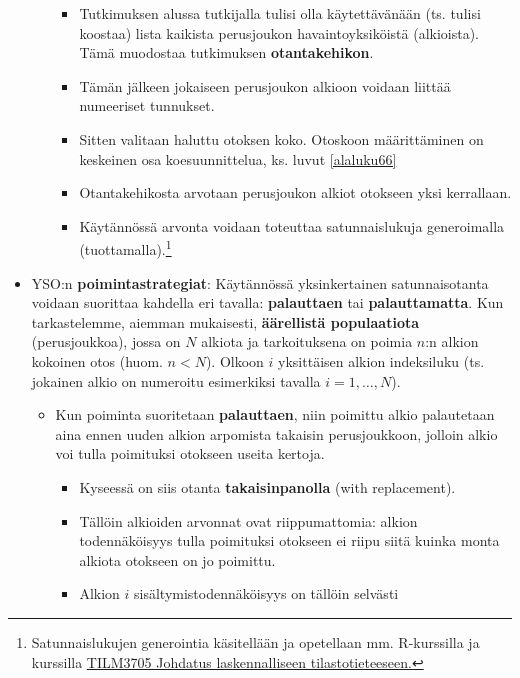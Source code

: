 \documentclass[
]{book}
\providecommand{\tightlist}{%
  \setlength{\itemsep}{0pt}\setlength{\parskip}{0pt}}
\begin{document}
\begin{itemize}
\begin{itemize}
    \begin{itemize}
    \tightlist
    \item
      Tutkimuksen alussa tutkijalla tulisi olla käytettävänään (ts. tulisi koostaa) lista kaikista perusjoukon havaintoyksiköistä (alkioista). Tämä muodostaa tutkimuksen \textbf{otantakehikon}.
    \item
      Tämän jälkeen jokaiseen perusjoukon alkioon voidaan liittää numeeriset tunnukset.
    \item
      Sitten valitaan haluttu otoksen koko. Otoskoon määrittäminen on keskeinen osa koesuunnittelua, ks. luvut \ref{alaluku66}
    \item
      Otantakehikosta arvotaan perusjoukon alkiot otokseen yksi kerrallaan.
    \item
      Käytännössä arvonta voidaan toteuttaa satunnaislukuja generoimalla (tuottamalla).\footnote{{} Satunnaislukujen generointia käsitellään ja opetellaan mm. R-kurssilla ja kurssilla \href{https://opas.peppi.utu.fi/fi/opintojakso/TILM3705/92210}{TILM3705 Johdatus laskennalliseen tilastotieteeseen.}}
    \end{itemize}
  \end{itemize}
\item
  YSO:n \textbf{poimintastrategiat}: Käytännössä yksinkertainen satunnaisotanta voidaan suorittaa kahdella eri tavalla: \textbf{palauttaen} tai \textbf{palauttamatta}. Kun tarkastelemme, aiemman mukaisesti, \textbf{äärellistä populaatiota} (perusjoukkoa), jossa on \(N\) alkiota ja tarkoituksena on poimia \(n\):n alkion kokoinen otos (huom. \(n<N\)). Olkoon \(i\) yksittäisen alkion indeksiluku (ts. jokainen alkio on numeroitu esimerkiksi tavalla \(i = 1,\ldots,N\)).

  \begin{itemize}
  \tightlist
  \item
    Kun poiminta suoritetaan \textbf{palauttaen}, niin poimittu alkio palautetaan aina ennen uuden alkion arpomista takaisin perusjoukkoon, jolloin alkio voi tulla poimituksi otokseen useita kertoja.

    \begin{itemize}
    \tightlist
    \item
      Kyseessä on siis otanta \textbf{takaisinpanolla} (with replacement).
    \item
      Tällöin alkioiden arvonnat ovat riippumattomia: alkion todennäköisyys tulla poimituksi otokseen ei riipu siitä kuinka monta alkiota otokseen on jo poimittu.
    \item
      Alkion \(i\) sisältymistodennäköisyys on tällöin selvästi
    \end{itemize}
  \end{itemize}
\end{itemize}
\end{document}
